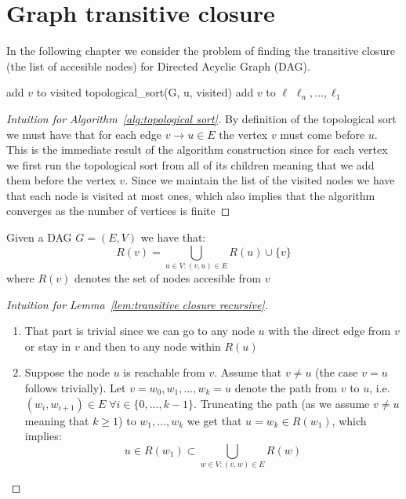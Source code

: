 \section{Graph transitive closure}
In the following chapter we consider the problem of finding the transitive closure (the list of accesible nodes) for Directed Acyclic Graph (DAG).
\begin{algorithm}[htp!]
    \caption{Topological sort for DAG} \label{alg:topological sort}
    add $v$ to $\text{visited}$\;
    {
        {
            topological\_sort(G, u, visited)\;
        }
    }
    add $v$ to $\ell$\;
    \Return $\ell_n, ..., \ell_1$
\end{algorithm}
\begin{proof}[Intuition for Algorithm~\ref{alg:topological sort}]
    By definition of the topological sort we must have that for each edge $v\to u \in E$ the vertex $v$ must come before $u$. This is the immediate result of the algorithm construction since for each vertex we first run the topological sort from all of its children meaning that we add them before the vertex $v$. Since we maintain the list of the visited nodes we have that each node is visited at most ones, which also implies that the algorithm converges as the number of vertices is finite
\end{proof}
\begin{lemma} \label{lem:transitive closure recursive}
    Given a DAG $G = (E, V)$ we have that:
    \[R(v) = \bigcup_{u \in V:(v, u) \in E} R(u) \cup \{v\}\]
    where $R(v)$ denotes the set of nodes accesible from $v$
\end{lemma}
\begin{proof}[Intuition for Lemma~\ref{lem:transitive closure recursive}] \hfill
    \begin{enumerate}[align = left]
        \item[``$\supset$''] That part is trivial since we can go to any node $u$ with the direct edge from $v$ or stay in $v$ and then to any node within $R(u)$
        \item[``$\subset$''] Suppose the node $u$ is reachable from $v$. Assume that $v \neq u$ (the case $v = u$ follows trivially). Let $v = w_0, w_1, ..., w_k = u$ denote the path from $v$ to $u$, i.e. $(w_i, w_{i+1}) \in E \; \forall i \in \{0, ..., k-1\}$. Truncating the path (as we assume $v \neq u$ meaning that $k \geq 1$) to $w_1, ..., w_k$ we get that $u = w_k \in R(w_1)$, which implies:
              \[u \in R(w_1) \subset \bigcup_{w \in V:(v, w) \in E} R(w)\]
    \end{enumerate}
\end{proof}
